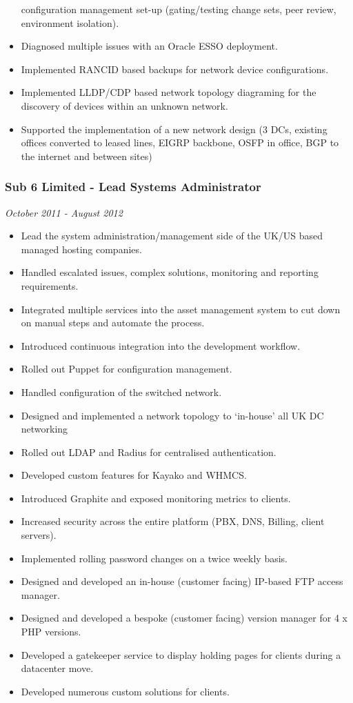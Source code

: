 \begin{itemize}
  configuration management set-up (gating/testing change sets, peer
  review, environment isolation).
\item
  Diagnosed multiple issues with an Oracle ESSO deployment.
\item
  Implemented RANCID based backups for network device configurations.
\item
  Implemented LLDP/CDP based network topology diagraming for the
  discovery of devices within an unknown network.
\item
  Supported the implementation of a new network design (3 DCs, existing
  offices converted to leased lines, EIGRP backbone, OSFP in office, BGP
  to the internet and between sites)
\end{itemize}

\subsubsection{Sub 6 Limited - Lead Systems
Administrator}\label{sub-6-limited---lead-systems-administrator}

\emph{October 2011 - August 2012}

\begin{itemize}
\tightlist
\item
  Lead the system administration/management side of the UK/US based
  managed hosting companies.
\item
  Handled escalated issues, complex solutions, monitoring and reporting
  requirements.
\item
  Integrated multiple services into the asset management system to cut
  down on manual steps and automate the process.
\item
  Introduced continuous integration into the development workflow.
\item
  Rolled out Puppet for configuration management.
\item
  Handled configuration of the switched network.
\item
  Designed and implemented a network topology to `in-house' all UK DC
  networking
\item
  Rolled out LDAP and Radius for centralised authentication.
\item
  Developed custom features for Kayako and WHMCS.
\item
  Introduced Graphite and exposed monitoring metrics to clients.
\item
  Increased security across the entire platform (PBX, DNS, Billing,
  client servers).
\item
  Implemented rolling password changes on a twice weekly basis.
\item
  Designed and developed an in-house (customer facing) IP-based FTP
  access manager.
\item
  Designed and developed a bespoke (customer facing) version manager for
  4 x PHP versions.
\item
  Developed a gatekeeper service to display holding pages for clients
  during a datacenter move.
\item
  Developed numerous custom solutions for clients.
\end{itemize}

